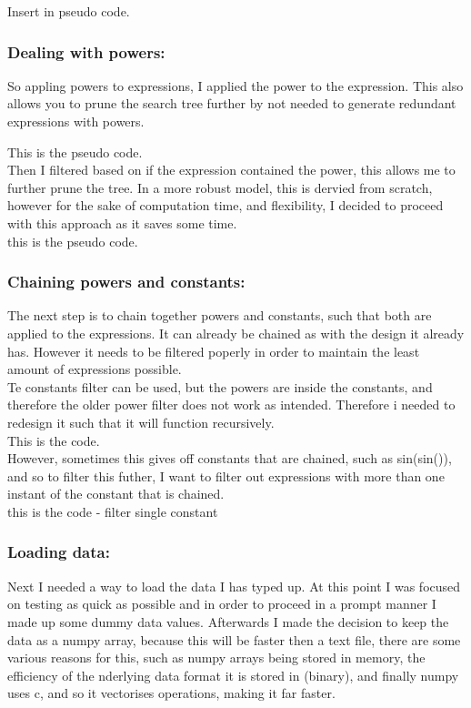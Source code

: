 \documentclass{article}
\begin{document}
Insert in pseudo code. \\ 

\subsubsection{ Dealing with powers: }

So appling powers to expressions, I applied the power to the expression. This also allows you to prune the search tree further by not needed to generate redundant expressions with powers. 

This is the pseudo code.\\

Then I filtered based on if the expression contained the power, this allows me to further prune the tree. In a more robust model, this is dervied from scratch, however for the sake of computation time, and flexibility, I decided to proceed with this approach as it saves some time.\\ 

this is the pseudo code.\\ 

\subsubsection{Chaining powers and constants: }

The next step is to chain together powers and constants, such that both are applied to the expressions. It can already be chained as with the design it already has. However it needs to be filtered poperly in order to maintain the least amount of expressions possible.\\

Te constants filter can be used, but the powers are inside the constants, and therefore the older power filter does not work as intended. Therefore i needed to redesign it such that it will function recursively.\\

This is the code.\\

However, sometimes this gives off constants that are chained, such as sin(sin()), and so to filter this futher, I want to filter out expressions with more than one instant of the constant that is chained.\\

this is the code - filter single constant\\


\subsubsection{ Loading data: }
Next I needed a way to load the data I has typed up. At this point I was focused on testing as quick as possible and in order to proceed in a prompt manner I made up some dummy data values. Afterwards I made the decision to keep the data as a numpy array, because this will be faster then a text file,  there are some various reasons for this, such as numpy arrays being stored in memory, the efficiency of the nderlying data format it is stored in (binary), and finally numpy uses c, and so it vectorises operations, making it far faster.\\ 
\end{document}
